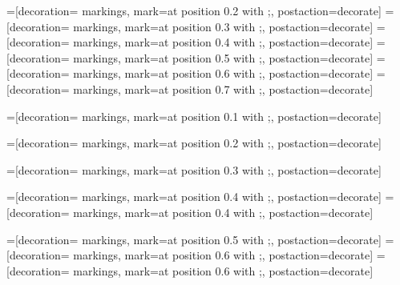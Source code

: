 
\usepackage{tikz,tikz-cd} %
\usetikzlibrary{arrows,shapes,trees}
\usetikzlibrary{backgrounds}
\usetikzlibrary{calc,decorations.pathmorphing,patterns}
\usetikzlibrary{decorations.markings}

\usetikzlibrary{positioning} %


=[decoration={ markings, mark=at position 0.2 with {;}}, postaction={decorate}]
=[decoration={ markings, mark=at position 0.3 with {;}}, postaction={decorate}]
=[decoration={ markings, mark=at position 0.4 with {;}}, postaction={decorate}]
=[decoration={ markings, mark=at position 0.5 with {;}}, postaction={decorate}]
=[decoration={ markings, mark=at position 0.6 with {;}}, postaction={decorate}]
=[decoration={ markings, mark=at position 0.7 with {;}}, postaction={decorate}]

\newcommand\PathArrowLineWidth{1.8pt}
\newcommand\PathArrowStyle{to}
=[decoration={ markings, mark=at position 0.1 with {\arrow[line width=\PathArrowLineWidth]{\PathArrowStyle};}}, postaction={decorate}]

=[decoration={ markings, mark=at position 0.2 with {\arrow[line width=\PathArrowLineWidth]{\PathArrowStyle};}}, postaction={decorate}]

=[decoration={ markings, mark=at position 0.3 with {\arrow[line width=\PathArrowLineWidth]{\PathArrowStyle};}}, postaction={decorate}]

=[decoration={ markings, mark=at position 0.4 with {\arrow[line width=\PathArrowLineWidth]{\PathArrowStyle};}}, postaction={decorate}]
=[decoration={ markings, mark=at position 0.4 with {\arrow[line width=0.7*\PathArrowLineWidth]{\PathArrowStyle};}}, postaction={decorate}]

=[decoration={ markings, mark=at position 0.5 with {\arrow[line width=\PathArrowLineWidth]{\PathArrowStyle};}}, postaction={decorate}]
=[decoration={ markings, mark=at position 0.6 with {\arrow[line width=\PathArrowLineWidth]{\PathArrowStyle};}}, postaction={decorate}]
=[decoration={ markings, mark=at position 0.6 with {\arrow[line width=0.7*\PathArrowLineWidth]{\PathArrowStyle};}}, postaction={decorate}]

